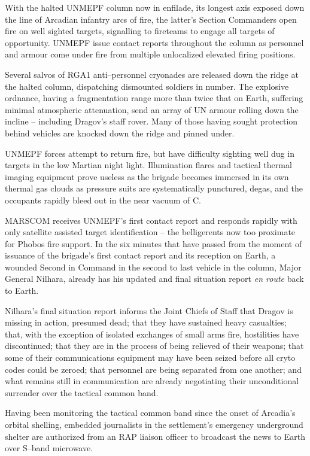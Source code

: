 With the halted UNMEPF column now in enfilade, its longest axis exposed down the line of Arcadian infantry arcs of fire, the latter's Section Commanders open fire on well sighted targets, signalling to fireteams to engage all targets of opportunity. UNMEPF issue contact reports throughout the column as personnel and armour come under fire from multiple unlocalized elevated firing positions.

Several salvos of RGA1 anti--personnel cryonades are released down the ridge at the halted column, dispatching dismounted soldiers in number. The explosive ordnance, having a fragmentation range more than twice that on Earth, suffering minimal atmospheric attenuation, send an array of UN armour rolling down the incline -- including Dragov's staff rover. Many of those having sought protection behind vehicles are knocked down the ridge and pinned under.

UNMEPF forces attempt to return fire, but have difficulty sighting well dug in targets in the low Martian night light. Illumination flares and tactical thermal imaging equipment prove useless as the brigade becomes immersed in its own thermal gas clouds as pressure suits are systematically punctured, degas, and the occupants rapidly bleed out in the near vacuum of C.

MARSCOM receives UNMEPF's first contact report and responds rapidly with only satellite assisted target identification -- the belligerents now too proximate for Phobos fire support. In the six minutes that have passed from the moment of issuance of the brigade's first contact report and its reception on Earth, a wounded Second in Command in the second to last vehicle in the column, Major General Nilhara, already has his updated and final situation report {\it en route} back to Earth.

Nilhara's final situation report informs the Joint Chiefs of Staff that Dragov is missing in action, presumed dead; that they have sustained heavy casualties; that, with the exception of isolated exchanges of small arms fire, hostilities have discontinued; that they are in the process of being relieved of their weapons; that some of their communications equipment may have been seized before all cryto codes could be zeroed; that personnel are being separated from one another; and what remains still in communication are already negotiating their unconditional surrender over the tactical common band.

Having been monitoring the tactical common band since the onset of Arcadia's orbital shelling, embedded journalists in the settlement's emergency underground shelter are authorized from an RAP liaison officer to broadcast the news to Earth over S--band microwave.
\StopTimelineDate

